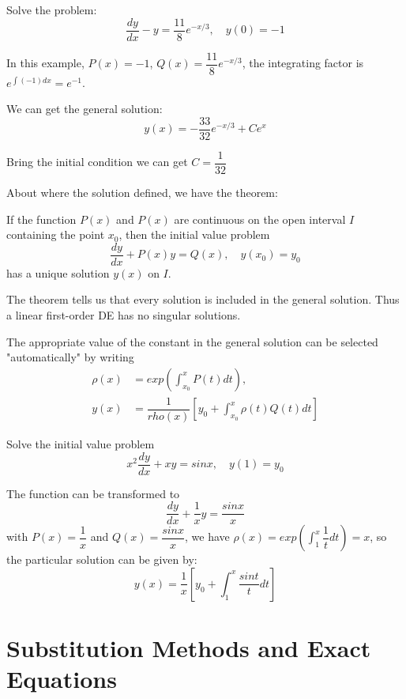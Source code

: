 \begin{example}
    Solve the problem:
    \[
        \dfrac{dy}{dx} - y = \dfrac{11}{8} e^{-x/3}, \quad y(0) = -1
    \]

    In this example, \(P(x) = -1\), \(Q(x) = \dfrac{11}{8}e^{-x/3}\), the integrating factor is \(e^{\int (-1) dx} = e^{-1}\). 

    We can get the general solution:
    \[
        y(x) = -\dfrac{33}{32}e^{-x/3} + Ce^x
    \]

    Bring the initial condition we can get \(C = \dfrac{1}{32}\) 
\end{example}

About where the solution defined, we have the theorem:
\begin{theorem}
    If the function \(P(x)\) and \(P(x)\) are continuous on the open interval \(I\) containing the point \(x_0\), then the initial value problem
    \[
        \dfrac{dy}{dx} + P(x)y = Q(x), \quad y(x_0) = y_0
    \]   
    has a unique solution \(y(x)\) on \(I\).
\end{theorem}
\begin{remark}
    The theorem tells us that every solution is included in the general solution. Thus a linear first-order DE has no singular solutions.
\end{remark}
\begin{remark}
    The appropriate value of the constant in the general solution can be selected "automatically" by writing
    \begin{align*}
        \rho(x) &= exp(\int_{x_0}^x P(t) dt),\\
        y(x) &= \dfrac{1}{rho(x)} [y_0 + \int_{x_0}^x \rho(t) Q(t) dt]
    \end{align*}
\end{remark}


\begin{example}
    Solve the initial value problem
    \[
        x^2 \dfrac{dy}{dx} + xy= sin x, \quad y(1) = y_0
    \] 

    The function can be transformed to
    \[
        \dfrac{dy}{dx} + \dfrac{1}{x}y = \dfrac{sin x}{x}
    \]
    with \(P(x) = \dfrac{1}{x}\) and \(Q(x) = \dfrac{sin x}{x}\), we have \(\rho(x) = exp(\int_1^x \dfrac{1}{t}dt) = x\),
    so the particular solution can be given by:
    \[
        y(x) = \dfrac{1}{x} [y_0 + \int_1^x \dfrac{sin t}{t}dt]
    \]
\end{example}

\section{Substitution Methods and Exact Equations}